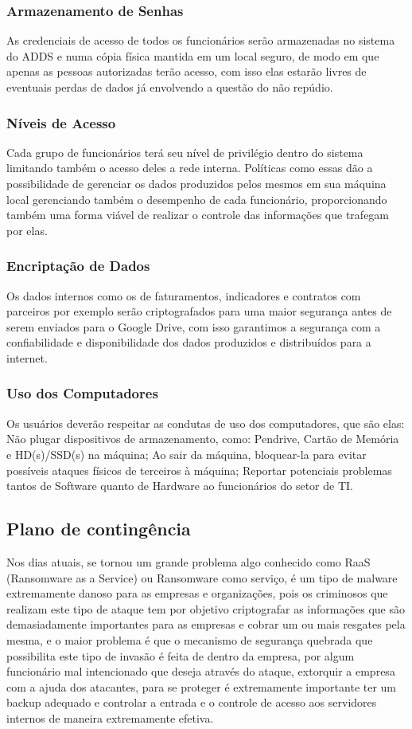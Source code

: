 \documentclass[12pt]{article}
\begin{document}
\subsubsection{Armazenamento de Senhas}
As credenciais de acesso de todos os funcionários serão armazenadas
no sistema do ADDS e numa cópia física mantida em um local seguro, de modo em que apenas as pessoas autorizadas terão acesso, com isso elas estarão livres de eventuais perdas de dados já envolvendo a questão do não repúdio.

\subsubsection{Níveis de Acesso}
Cada grupo de funcionários terá seu nível de privilégio dentro do sistema limitando também o acesso deles a rede interna. Políticas como essas dão a possibilidade de gerenciar os dados produzidos pelos mesmos em sua máquina local gerenciando também o desempenho de cada funcionário, proporcionando também uma forma viável de realizar o controle das informações que trafegam por elas.

\subsubsection{Encriptação de Dados}
Os dados internos como os de faturamentos, indicadores e contratos com parceiros por exemplo serão criptografados para uma maior segurança antes de serem enviados para o Google Drive, com isso garantimos a segurança com a confiabilidade e disponibilidade dos dados produzidos e distribuídos para a internet.

\subsubsection{Uso dos Computadores}
Os usuários deverão respeitar as condutas de uso dos computadores, que são elas: Não plugar dispositivos de armazenamento, como: Pendrive, Cartão de Memória e HD(s)/SSD(s) na máquina; Ao sair da máquina, bloquear-la para evitar possíveis ataques físicos de terceiros à máquina; Reportar potenciais problemas tantos de Software quanto de Hardware ao funcionários do setor de TI.

\subsection{Plano de contingência}
Nos dias atuais, se tornou um grande problema algo conhecido como RaaS (Ransomware as a Service) ou Ransomware como serviço, é um tipo de malware extremamente danoso para as empresas e organizações, pois os criminosos que realizam este tipo de ataque tem por objetivo criptografar as informações que são demasiadamente importantes para as empresas e cobrar um ou mais resgates pela mesma, e o maior problema é que o mecanismo de segurança quebrada que possibilita este tipo de invasão é feita de dentro da empresa, por algum funcionário mal intencionado que deseja através do ataque, extorquir a empresa com a ajuda dos atacantes, para se proteger é extremamente importante ter um backup adequado e controlar a entrada e o controle de acesso aos servidores internos de maneira extremamente efetiva.
\end{document}

